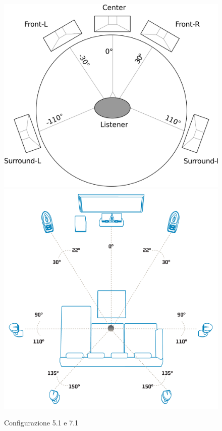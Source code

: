 \documentclass[12pt,a4paper]{report}
\begin{document}
\begin{figure}[htbp]
	\centering
	\includegraphics[scale=0.18]{figures/5-1.png}\includegraphics[scale=0.34]{figures/7-1.png}
	\caption {Configurazione 5.1 e 7.1} 
	\label{fig:5.1}
	\end{figure}
  
\end{document}

